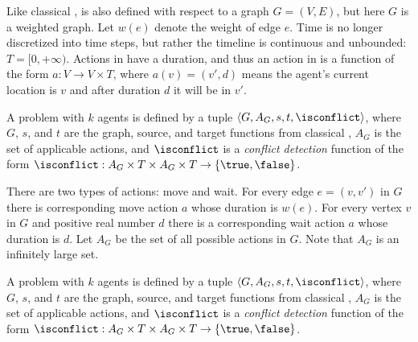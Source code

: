 



Like classical \mapfr, \mapfect is also defined with respect to a graph $G=(V,E)$, but here $G$ is a weighted graph. 
Let $w(e)$ denote the weight of edge $e$. 
Time is no longer discretized into time steps, but rather the timeline is continuous and unbounded: $T=[0, +\infty)$. 
Actions in \mapfect have a duration, and thus an action in \mapfect is a function of the form $a:V\rightarrow V\times T$, 
where $a(v)=(v',d)$ means the agent's current location is $v$ and after duration $d$ it will be in $v'$. 


A \mapfect problem with $k$ agents is defined by a tuple 
$\langle G, A_G, s, t, \isconflict \rangle$, 
where $G$, $s$, and $t$ are the graph, source, and target functions from classical \mapf, 
$A_G$ is the set of applicable actions, 
and $\isconflict$ is a \emph{conflict detection} function of the form
$\isconflict: A_G\times T\times A_G \times T\rightarrow \{\true, \false\}$. 



There are two types of actions: move and wait. 
For every edge $e=(v,v')$ in $G$ there is corresponding move action $a$ whose duration is $w(e)$. 
For every vertex $v$ in $G$ and positive real number $d$ there is a corresponding wait action $a$ whose duration is $d$. 
Let $A_G$ be the set of all possible actions in $G$. Note that $A_G$ is an infinitely large set. 


A \mapfect problem with $k$ agents is defined by a tuple 
$\langle G, A_G, s, t, \isconflict \rangle$, 
where $G$, $s$, and $t$ are the graph, source, and target functions from classical \mapf, 
$A_G$ is the set of applicable actions, 
and $\isconflict$ is a \emph{conflict detection} function of the form
$\isconflict: A_G\times T\times A_G \times T\rightarrow \{\true, \false\}$. 

